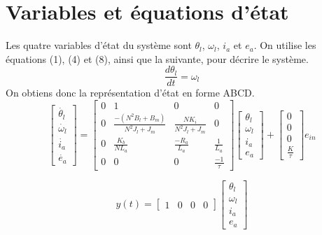 \documentclass{udes_rapport} %
\begin{document}
\section{Variables et équations d'état}
Les quatre variables d'état du système sont $\theta_l$, $\omega_l$, $i_a$ et $e_a$.
On utilise les équations (1), (4) et (8), ainsi que la suivante, pour décrire le système.
\begin{equation}
\frac{d\theta_l}{dt} = \omega_l
\end{equation}
On obtiens donc la représentation d'état en forme ABCD.
\
$$
\begin{bmatrix}
\dot{\theta_l} \\
\dot{\omega_l} \\
\dot{i_a} \\
\dot{e_a} 
\end{bmatrix}
=
\begin{bmatrix}
0 & 1 & 0 & 0 \\
0 & \frac{-(N^2B_l + B_m)}{N^2J_l + J_m} & \frac{NK_i}{N^2J_l + J_m} & 0 \\
0 & \frac{K_b}{NL_a} & \frac{-R_a}{L_a} & \frac{1}{L_a} \\
0 & 0 & 0 & \frac{-1}{\tau}
\end{bmatrix}
\begin{bmatrix}
\theta_l \\
\omega_l \\
i_a \\
e_a 
\end{bmatrix}
+
\begin{bmatrix}
0 \\
0\\
0\\
\frac{K}{\tau}
\end{bmatrix} 
e_{in}
$$

$$
y(t) = 
\begin{bmatrix}
1 & 0 & 0 & 0
\end{bmatrix} 
\begin{bmatrix}
\theta_l \\ \omega_l \\ i_a \\ e_a
\end{bmatrix} 
$$
\end{document}
